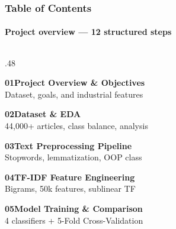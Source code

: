 \documentclass[aspectratio=169,10pt]{beamer}
\begin{document}
\begin{frame}[t]
\frametitle{Table of Contents}
\framesubtitle{Project overview --- 12 structured steps}
\vspace{.12cm}
\begin{columns}[t]
\begin{column}{.48\textwidth}
\vspace{-15pt}
  \begin{tcolorbox}[mycard={ABlue}{ABlue},borderline west={4pt}{0pt}{ABlue},top=2pt,bottom=2pt]
    \textcolor{ABlue}{\textbf{01}}\quad\textbf{\small Project Overview \& Objectives}\\
    {\tiny\color{Slate}Dataset, goals, and industrial features}
  \end{tcolorbox}\vspace{1pt}
  \begin{tcolorbox}[mycard={ATeal}{ATeal},borderline west={4pt}{0pt}{ATeal},top=2pt,bottom=2pt]
    \textcolor{ATeal}{\textbf{02}}\quad\textbf{\small Dataset \& EDA}\\
    {\tiny\color{Slate}44,000+ articles, class balance, analysis}
  \end{tcolorbox}\vspace{1pt}
  \begin{tcolorbox}[mycard={AGreen}{AGreen},borderline west={4pt}{0pt}{AGreen},top=2pt,bottom=2pt]
    \textcolor{AGreen}{\textbf{03}}\quad\textbf{\small Text Preprocessing Pipeline}\\
    {\tiny\color{Slate}Stopwords, lemmatization, OOP class}
  \end{tcolorbox}\vspace{1pt}
  \begin{tcolorbox}[mycard={AOrange}{AOrange},borderline west={4pt}{0pt}{AOrange},top=2pt,bottom=2pt]
    \textcolor{AOrange}{\textbf{04}}\quad\textbf{\small TF-IDF Feature Engineering}\\
    {\tiny\color{Slate}Bigrams, 50k features, sublinear TF}
  \end{tcolorbox}\vspace{1pt}
  \begin{tcolorbox}[mycard={APurple}{APurple},borderline west={4pt}{0pt}{APurple},top=2pt,bottom=2pt]
    \textcolor{APurple}{\textbf{05}}\quad\textbf{\small Model Training \& Comparison}\\
    {\tiny\color{Slate}4 classifiers + 5-Fold Cross-Validation}

\end{tcolorbox}
\end{column}
\end{columns}
\end{frame}
\end{document}
